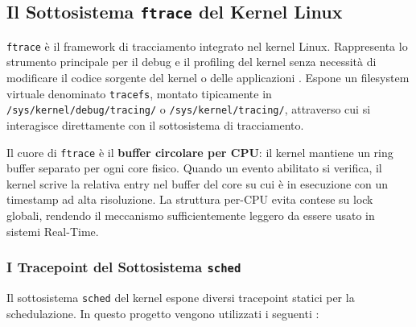 \subsection{Il Sottosistema \texttt{ftrace} del Kernel Linux}

\texttt{ftrace} è il framework di tracciamento integrato nel kernel Linux. Rappresenta lo strumento principale per il debug e il profiling del kernel senza necessità di modificare il codice sorgente del kernel o delle applicazioni \cite{rostedt_ftrace}. Espone un filesystem virtuale denominato \texttt{tracefs}, 
montato tipicamente in \texttt{/sys/kernel/debug/tracing/}  o \texttt{/sys/kernel/tracing/}, attraverso cui si interagisce direttamente con il sottosistema di tracciamento.

Il cuore di \texttt{ftrace} è il \textbf{buffer circolare per CPU}: il kernel mantiene un ring buffer separato per ogni core fisico. Quando un evento abilitato si verifica, il kernel scrive la relativa entry nel buffer del core su cui è in esecuzione con un timestamp ad alta risoluzione. La struttura per-CPU evita contese su lock globali, rendendo il meccanismo sufficientemente leggero da essere usato in sistemi Real-Time.

\subsubsection{I Tracepoint del Sottosistema \texttt{sched}}

Il sottosistema \texttt{sched} del kernel espone diversi tracepoint statici per la schedulazione. In questo progetto vengono utilizzati i seguenti \cite{tracecmd_record_man}:


